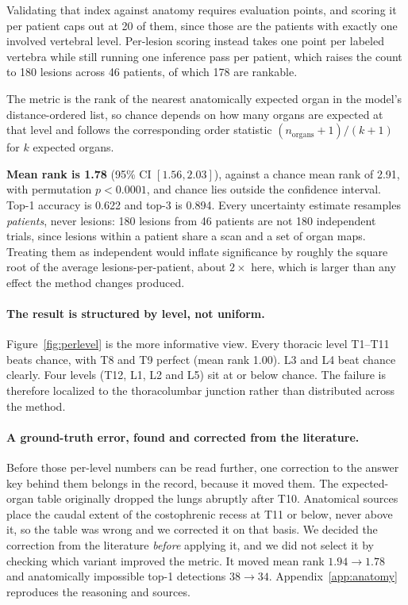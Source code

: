 Validating that index against anatomy requires evaluation points, and scoring it
per patient caps out at 20 of them, since those are the patients with exactly
one involved vertebral level. Per-lesion scoring instead takes one point per
labeled vertebra while still running one inference pass per patient, which
raises the count to 180 lesions across 46 patients, of which 178 are rankable.

The metric is the rank of the nearest anatomically expected organ in the model's
distance-ordered list, so chance depends on how many organs are expected at that
level and follows the corresponding order statistic
$(n_{\text{organs}}+1)/(k+1)$ for $k$ expected organs.

\textbf{Mean rank is 1.78} (95\% CI $[1.56, 2.03]$), against a chance mean rank
of 2.91, with permutation $p < 0.0001$, and chance lies outside the confidence
interval. Top-1 accuracy is 0.622 and top-3 is 0.894. Every uncertainty estimate
resamples \emph{patients}, never lesions: 180 lesions from 46 patients are not
180 independent trials, since lesions within a patient share a scan and
a set of organ maps. Treating them as independent would inflate significance by
roughly the square root of the average lesions-per-patient, about $2\times$
here, which is larger than any effect the method changes produced.

\paragraph{The result is structured by level, not uniform.}
Figure~\ref{fig:perlevel} is the more informative view. Every thoracic level
T1--T11 beats chance, with T8 and T9 perfect (mean rank 1.00). L3 and L4
beat chance clearly. Four levels (T12, L1, L2 and L5) sit at or below chance.
The failure is therefore localized to the thoracolumbar junction rather than
distributed across the method.

\paragraph{A ground-truth error, found and corrected from the literature.}
Before those per-level numbers can be read further, one correction to the answer
key behind them belongs in the record, because it moved them. The expected-organ
table originally dropped the lungs abruptly after T10. Anatomical sources place
the caudal extent of the costophrenic recess at T11 or below, never above it, so
the table was wrong and we corrected it on that basis.
We decided the correction from the literature \emph{before} applying it, and we
did not select it by checking which variant improved the metric. It moved mean
rank $1.94 \to 1.78$ and anatomically impossible top-1 detections $38 \to 34$.
Appendix~\ref{app:anatomy} reproduces the reasoning and sources.

